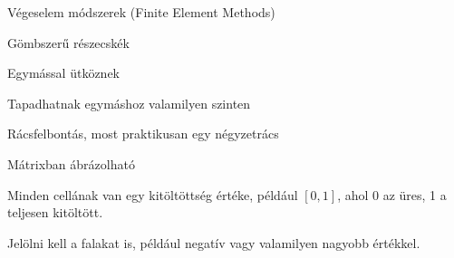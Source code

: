 

Végeselem módszerek (Finite Element Methods)


Gömbszerű részecskék

Egymással ütköznek

Tapadhatnak egymáshoz valamilyen szinten


Rácsfelbontás, most praktikusan egy négyzetrács

Mátrixban ábrázolható

Minden cellának van egy kitöltöttség értéke, például $[0, 1]$, ahol 0 az üres, 1 a teljesen kitöltött.

Jelölni kell a falakat is, például negatív vagy valamilyen nagyobb értékkel.
